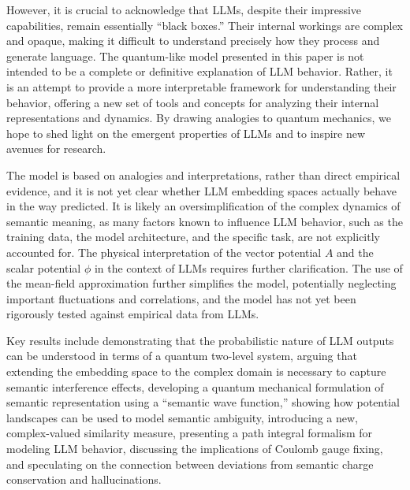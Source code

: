 \documentclass[prd,amsmath,amssymb,12pt]{revtex4}
\begin{document}
However, it is crucial to acknowledge that LLMs, despite their impressive capabilities,
remain essentially ``black boxes.'' Their internal workings are complex and opaque, making
it difficult to understand precisely how they process and generate language. The quantum-like
model presented in this paper is not intended to be a complete or definitive explanation of
LLM behavior. Rather, it is an attempt to provide a more interpretable framework for
understanding their behavior, offering a new set of tools and concepts for analyzing their
internal representations and dynamics. By drawing analogies to quantum mechanics, we hope to
shed light on the emergent properties of LLMs and to inspire new avenues for research.

The model is based on analogies and interpretations, rather than direct empirical evidence,
and it is not yet clear whether LLM embedding spaces actually behave in the way predicted.
It is likely an oversimplification of the complex dynamics of semantic meaning, as many
factors known to influence LLM behavior, such as the training data, the model architecture,
and the specific task, are not explicitly accounted for. The physical interpretation of the
vector potential $A$ and the scalar potential $\phi$ in the context of LLMs requires further
clarification. The use of the mean-field approximation further simplifies the model,
potentially neglecting important fluctuations and correlations, and the model has not
yet been rigorously tested against empirical data from LLMs.

Key results include demonstrating that the probabilistic nature of LLM outputs can be
understood in terms of a quantum two-level system, arguing that extending the embedding
space to the complex domain is necessary to capture semantic interference effects,
developing a quantum mechanical formulation of semantic representation using a ``semantic wave function,''
showing how potential landscapes can be used to model semantic ambiguity, introducing a new,
complex-valued similarity measure, presenting a path integral formalism for modeling LLM behavior,
discussing the implications of Coulomb gauge fixing, and speculating on the connection between
deviations from semantic charge conservation and hallucinations.
\end{document}
